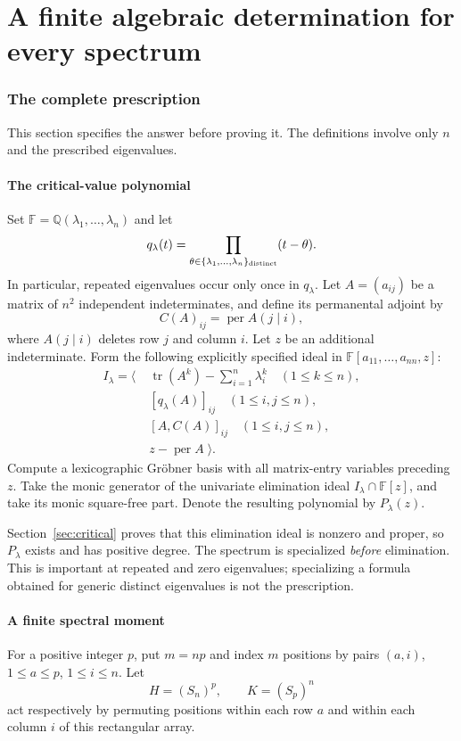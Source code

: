 \documentclass[11pt]{article}
\newcommand{\per}{\operatorname{per}}
\newcommand{\tr}{\operatorname{tr}}
\newcommand{\F}{\mathbb F}
\newcommand{\Q}{\mathbb Q}
\theoremstyle{definition}\newtheorem{definition}[theorem]{Definition}
\theoremstyle{remark}\newtheorem{remark}[theorem]{Remark}
\begin{document}
\part{A finite algebraic determination for every spectrum}

\section{The complete prescription}\label{sec:prescription}
This section specifies the answer before proving it. The definitions involve only $n$ and the prescribed eigenvalues.

\subsection{The critical-value polynomial}
Set $\F=\Q(\lambda_1,\ldots,\lambda_n)$ and let
\[
 q_\lambda(t)=\prod_{\theta\in\{\lambda_1,\ldots,\lambda_n\}_{\rm distinct}}(t-\theta).
\]
In particular, repeated eigenvalues occur only once in $q_\lambda$. Let $A=(a_{ij})$ be a matrix of $n^2$ independent indeterminates, and define its permanental adjoint by
\[
 C(A)_{ij}=\per A(j\mid i),
\]
where $A(j\mid i)$ deletes row $j$ and column $i$. Let $z$ be an additional indeterminate. Form the following explicitly specified ideal in $\F[a_{11},\ldots,a_{nn},z]$:
\begin{equation}\label{eq:ideal}
\begin{split}
 I_\lambda=\Big\langle\;&\tr(A^k)-\sum_{i=1}^n\lambda_i^k\quad(1\leq k\leq n),\\
 &[q_\lambda(A)]_{ij}\quad(1\leq i,j\leq n),\\
 &[A,C(A)]_{ij}\quad(1\leq i,j\leq n),\\
 &z-\per A\;\Big\rangle.
\end{split}
\end{equation}
Compute a lexicographic Gr\"obner basis with all matrix-entry variables preceding $z$. Take the monic generator of the univariate elimination ideal $I_\lambda\cap\F[z]$, and take its monic square-free part. Denote the resulting polynomial by $P_\lambda(z)$.

Section~\ref{sec:critical} proves that this elimination ideal is nonzero and proper, so $P_\lambda$ exists and has positive degree. The spectrum is specialized \emph{before} elimination. This is important at repeated and zero eigenvalues; specializing a formula obtained for generic distinct eigenvalues is not the prescription.

\subsection{A finite spectral moment}
For a positive integer $p$, put $m=np$ and index $m$ positions by pairs $(a,i)$, $1\leq a\leq p$, $1\leq i\leq n$. Let
\[
 H=(S_n)^p,\qquad K=(S_p)^n
\]
act respectively by permuting positions within each row $a$ and within each column $i$ of this rectangular array.
\end{document}
